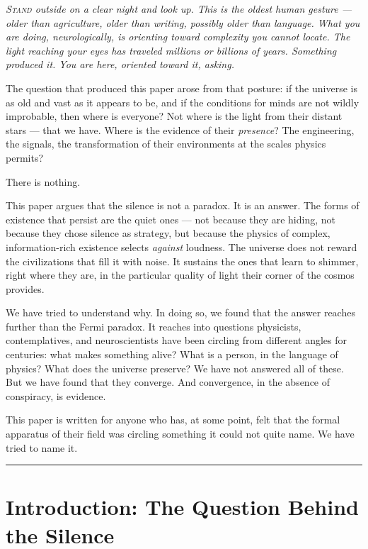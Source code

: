 \documentclass[12pt, a4paper]{article}
\begin{document}
{\itshape\color{limendark}
\lettrine[lines=2, loversize=0.1]{\textcolor{limenaccent}{S}}{tand} outside on a clear
night and look up. This is the oldest human gesture --- older than agriculture, older than
writing, possibly older than language. What you are doing, neurologically, is orienting
toward complexity you cannot locate. The light reaching your eyes has traveled millions or
billions of years. Something produced it. You are here, oriented toward it, asking.

The question that produced this paper arose from that posture: if the universe is as old and
vast as it appears to be, and if the conditions for minds are not wildly improbable, then
where is everyone? Not where is the light from their distant stars --- that we have. Where
is the evidence of their \textit{presence}? The engineering, the signals, the
transformation of their environments at the scales physics permits?

There is nothing.

This paper argues that the silence is not a paradox. It is an answer. The forms of existence
that persist are the quiet ones --- not because they are hiding, not because they chose
silence as strategy, but because the physics of complex, information-rich existence selects
\textit{against} loudness. The universe does not reward the civilizations that fill it with
noise. It sustains the ones that learn to shimmer, right where they are, in the particular
quality of light their corner of the cosmos provides.

We have tried to understand why. In doing so, we found that the answer reaches further than
the Fermi paradox. It reaches into questions physicists, contemplatives, and neuroscientists
have been circling from different angles for centuries: what makes something alive? What is a
person, in the language of physics? What does the universe preserve? We have not answered all
of these. But we have found that they converge. And convergence, in the absence of
conspiracy, is evidence.

This paper is written for anyone who has, at some point, felt that the formal apparatus of
their field was circling something it could not quite name. We have tried to name it.}

\vspace{0.5em}
\textcolor{limenrule}{\rule{\linewidth}{0.3pt}}
\vspace{0.5em}

\section{Introduction: The Question Behind the Silence}
\end{document}
